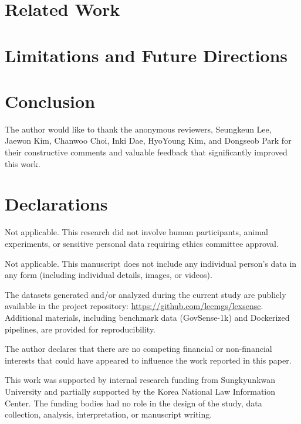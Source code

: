 \documentclass[pdflatex,sn-mathphys-num]{sn-jnl}%
\theoremstyle{thmstyleone}%
\theoremstyle{thmstyletwo}%
\theoremstyle{thmstylethree}%
\begin{document}
\section{Related Work}\label{sec:related_work}



\section{Limitations and Future Directions}




\section{Conclusion}\label{sec:conclusion}



\backmatter

The author would like to thank the anonymous reviewers, Seungkeun Lee, Jaewon Kim, Chanwoo Choi, Inki Dae, HyoYoung Kim, and Dongseob Park for their constructive comments and valuable feedback that significantly improved this work.


\section*{Declarations}

Not applicable. This research did not involve human participants, animal experiments, or sensitive personal data requiring ethics committee approval.

Not applicable. This manuscript does not include any individual person’s data in any form (including individual details, images, or videos).

The datasets generated and/or analyzed during the current study are publicly available in the project repository:
\url{https://github.com/leemgs/lexsense}. Additional materials, including benchmark data (GovSense-1k) and Dockerized pipelines, are provided for reproducibility.

The author declares that there are no competing financial or non-financial interests that could have appeared to influence the work reported in this paper.

This work was supported by internal research funding from Sungkyunkwan University and partially supported by the Korea National Law Information Center. The funding bodies had no role in the design of the study, data collection, analysis, interpretation, or manuscript writing.
\end{document}
